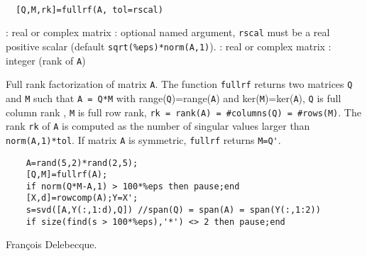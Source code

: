 \begin{mandesc}
   \\ %
\end{mandesc}
\begin{calling_sequence}
\begin{verbatim}
  [Q,M,rk]=fullrf(A, tol=rscal)  
\end{verbatim}
\end{calling_sequence}
\begin{parameters}
  \begin{varlist}
    : real or complex matrix
    : optional named argument, \verb+rscal+ must be  a real 
    positive scalar (default \verb+sqrt(%eps)*norm(A,1)+).
    : real or complex matrix
    : integer (rank of \verb!A!)
  \end{varlist}
\end{parameters}
\begin{mandescription}
  Full rank factorization of matrix \verb!A!. The function \verb!fullrf! returns
  two matrices \verb!Q! and \verb!M! such that \verb!A = Q*M!  with
  range(\verb!Q!)=range(\verb!A!) and ker(\verb!M!)=ker(\verb!A!), \verb!Q! is
  full column rank , \verb!M! is full row rank,
  \verb!rk = rank(A) = #columns(Q) = #rows(M)!. The rank \verb!rk! of \verb!A!
  is computed as the number of singular values larger than \verb!norm(A,1)*tol!.
  If matrix \verb!A! is symmetric, \verb!fullrf! returns \verb!M=Q'!.
\end{mandescription}
\begin{examples}
  \begin{Verbatim}
    A=rand(5,2)*rand(2,5);
    [Q,M]=fullrf(A);
    if norm(Q*M-A,1) > 100*%eps then pause;end
    [X,d]=rowcomp(A);Y=X';
    s=svd([A,Y(:,1:d),Q]) //span(Q) = span(A) = span(Y(:,1:2))
    if size(find(s > 100*%eps),'*') <> 2 then pause;end
  \end{Verbatim}
\end{examples}
\begin{manseealso}
     
     
\end{manseealso}
\begin{authors}
  Fran\c{c}ois Delebecque.
\end{authors}
